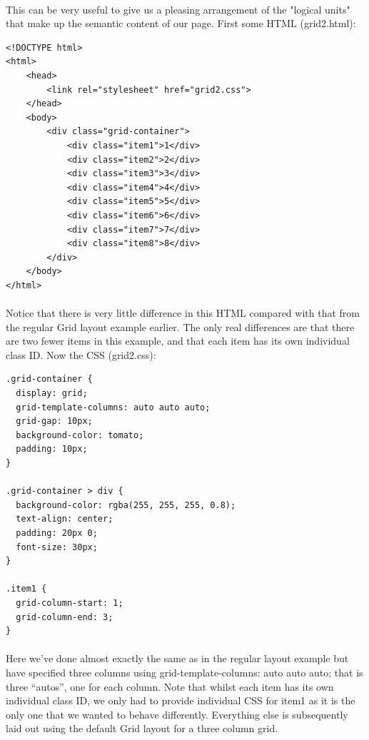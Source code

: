 \paragraph{} This can be very useful to give us a pleasing arrangement of the "logical units" that make up the semantic content of our page. First some HTML (grid2.html):

\begin{lstlisting}
<!DOCTYPE html>
<html>
	<head>
		<link rel="stylesheet" href="grid2.css">
	</head>
	<body>
		<div class="grid-container">
  			<div class="item1">1</div>
  			<div class="item2">2</div>
  			<div class="item3">3</div>  
  			<div class="item4">4</div>
 	 		<div class="item5">5</div>
  			<div class="item6">6</div>
  			<div class="item7">7</div>
  			<div class="item8">8</div>  
		</div>
	</body>
</html>
\end{lstlisting}

\paragraph{} Notice that there is very little difference in this HTML compared with that from the regular Grid layout example earlier. The only real differences are that there are two fewer items in this example, and that each item has its own individual class ID. Now the CSS (grid2.css):

\begin{lstlisting}
.grid-container {
  display: grid;
  grid-template-columns: auto auto auto;
  grid-gap: 10px;
  background-color: tomato;
  padding: 10px;
}

.grid-container > div {
  background-color: rgba(255, 255, 255, 0.8);
  text-align: center;
  padding: 20px 0;
  font-size: 30px;
}

.item1 {
  grid-column-start: 1;
  grid-column-end: 3;
}
\end{lstlisting}

\paragraph{} Here we've done almost exactly the same as in the regular layout example but have specified three columns using grid-template-columns: auto auto auto; that is three ``autos'', one for each column. Note that whilst each item has its own individual class ID, we only had to provide individual CSS for  item1 as it is the only one that we wanted to behave differently. Everything else is subsequently laid out using the default Grid layout for a three column grid.



